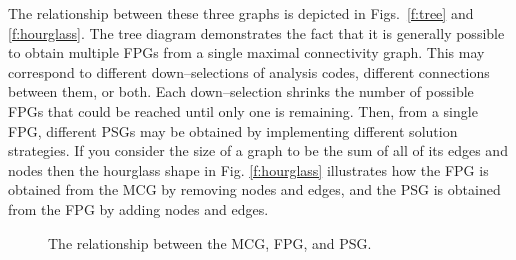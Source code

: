   The relationship between these three graphs is depicted in Figs.~\ref{f:tree} and \ref{f:hourglass}. 
  The tree diagram demonstrates the fact that it is generally possible to obtain 
  multiple FPGs from a single maximal connectivity graph. This  may correspond to 
  different down--selections of analysis codes, different connections between them, 
  or both. Each down--selection shrinks the number of possible FPGs that could be reached 
  until only one is remaining. Then, from a single FPG, different PSGs may be obtained by implementing 
  different solution strategies. If you consider the size of a graph to be the sum of all of its
  edges and nodes then the hourglass shape in Fig. \ref{f:hourglass} illustrates how
  the FPG is obtained from the MCG by removing nodes and edges, 
  and the PSG is obtained from the FPG by adding nodes and edges.

  \begin{figure}[htb!]
    \centering
  \caption{The relationship between the MCG, FPG, and PSG.}
  \end{figure}

